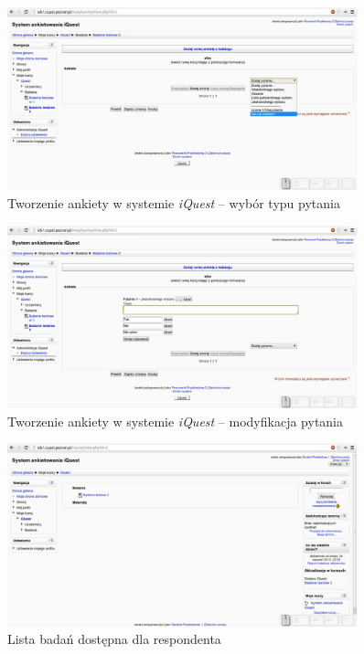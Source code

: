 \begin{figure}[H]
\centering\includegraphics[width=0.9\textwidth]{figures/kb/W2-tworzenieankiety}
\caption{Tworzenie ankiety w systemie \textit{iQuest} -- wybór typu pytania}\label{rys:TworzenieAnkiety}
\end{figure}

\begin{figure}[H]
\centering\includegraphics[width=0.9\textwidth]{figures/kb/W2-tworzenieankiety2}
\caption{Tworzenie ankiety w systemie \textit{iQuest} -- modyfikacja pytania}\label{rys:TworzenieAnkiety2}
\end{figure}

\begin{figure}[H]
\centering\includegraphics[width=0.9\textwidth]{figures/kb/W2-wyborbadania}
\caption{Lista badań dostępna dla respondenta}\label{rys:WyborBadania}
\end{figure}

